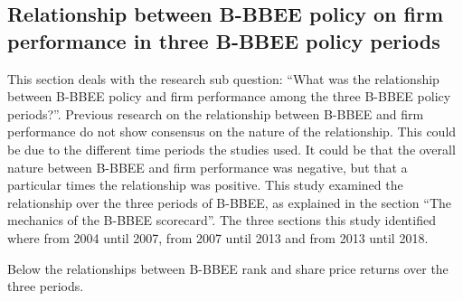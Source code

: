 \subsection{Relationship between B-BBEE policy on firm performance in three B-BBEE policy periods}
This section deals with the research sub question: “What was the relationship between B-BBEE policy and firm performance among the three B-BBEE policy periods?”. Previous research on the relationship between B-BBEE and firm performance do not show consensus on the nature of the relationship. This could be due to the different time periods the studies used. It could be that the overall nature between B-BBEE and firm performance was negative, but that a particular times the relationship was positive. This study examined the relationship over the three periods of B-BBEE, as explained in the section “The mechanics of the B-BBEE scorecard”. The three sections this study identified where from 2004 until 2007, from 2007 until 2013 and from 2013 until 2018.

Below the relationships between B-BBEE rank and share price returns over the three periods.

\begin{table}[H] 
\tiny %
\centering
\caption{Regression Model 1, sub sections} 
\end{table} 

